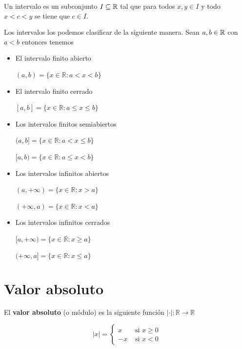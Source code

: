 \begin{definition}[Intervalo] 

Un intervalo es un subconjunto $I \subseteq \mathbb{R}$ tal que para todos $x,y \in I$ y todo $x < c < y$ se tiene que $c \in I$.

Los intervalos los podemos clasificar de la siguiente manera.  Sean $a,b \in \mathbb{R}$ con $a<b$ entonces tenemos

\begin{itemize}

\item El intervalo finito abierto 

$(a,b) = \{ x \in \mathbb{R} : a < x < b \}$

\item El intervalo finito cerrado

$[a,b] = \{ x \in \mathbb{R} : a \leq x \leq b \}$

\item Los intervalos finitos semiabiertos

$(a,b] = \{ x \in \mathbb{R} : a < x \leq b \}$

$[a,b) = \{ x \in \mathbb{R} : a \leq x < b \}$

\item Los intervalos infinitos abiertos

$(a, +\infty) = \{ x \in \mathbb{R} : x > a \}$

$(+\infty, a) = \{ x \in \mathbb{R} : x < a \}$

\item Los intervalos infinitos cerrados

$[a, +\infty) = \{ x \in \mathbb{R} : x \geq a \}$

$(+\infty, a] = \{ x \in \mathbb{R} : x \leq a \}$

\end{itemize}
\end{definition}



\section{Valor absoluto}

\begin{definition} \label{funcion_modulo} 
El \textbf{valor absoluto} (o módulo) es la siguiente función $| \cdot | : \mathbb{R} \to \mathbb{R}$

$$ |x| = \begin{cases} x & \textrm{ si } x \geq 0 \\ -x & \textrm{ si } x < 0 \end{cases} $$

\end{definition}

